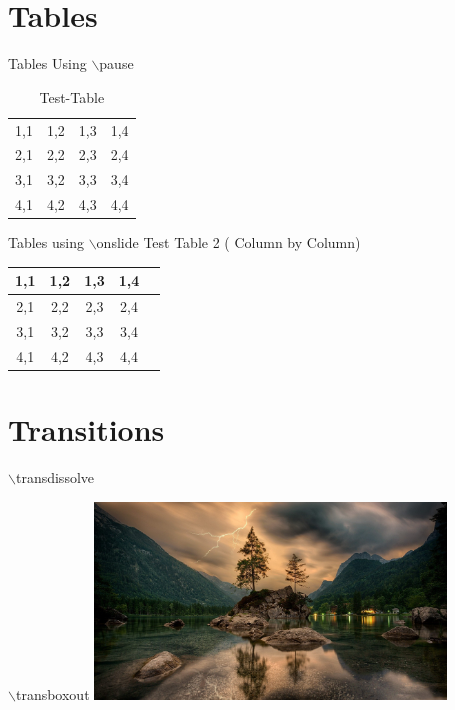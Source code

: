 \documentclass{beamer}
\begin{document}
    \section{Tables}
    \begin{frame}{ Tables Using $\backslash$pause }
        \begin{table}[h]
            \centering
            \caption{Test-Table}
            \begin{tabular}{p{2cm} |p{2cm} |p{2cm} |p{2cm} }
                \hline
                 1,1 & 1,2 & 1,3 & 1,4  \pause \\ 
                 2,1 & 2,2 & 2,3 & 2,4 \pause \\   
                 3,1 & 3,2 & 3,3 & 3,4 \pause \\
                 4,1 & 4,2 & 4,3 & 4,4  \\
                 \hline 
            \end{tabular}
            
            \label{tab:Test-Table1}
        \end{table}
    \end{frame}
    
    \begin{frame}{Tables using $\backslash$onslide}
    \centering
    \vfill
    \alert{Test Table 2 ( Column by Column)} \\
    \vfill
    \begin{tabular}{c<{\onslide<2->}c<{\onslide<3->}c<{\onslide<4->}c<{\onslide}c}
        \hline
         1,1 & 1,2 & 1,3 & 1,4  \\
         \hline
         2,1 & 2,2 & 2,3 & 2,4 \\
         3,1 & 3,2 & 3,3 & 3,4 \\
         4,1&4,2&4,3&4,4 \\
    \end{tabular}
\end{frame}
    
    \section{Transitions}
        \begin{frame}{$\backslash$transdissolve}
        \transdissolve
        \blindtext
        \end{frame}

        \begin{frame}{$\backslash$transboxout}
        \transboxout
        \includegraphics[width=0.7\textwidth]{images/nature1.jpg}
        \end{frame}
        
\end{document}
